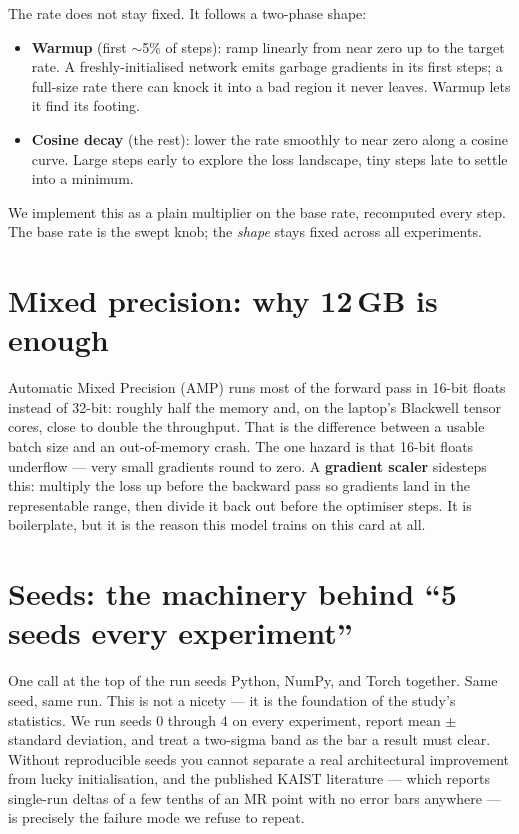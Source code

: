 \documentclass[../main.tex]{subfiles}
\begin{document}
The rate does not stay fixed. It follows a two-phase shape:

\begin{itemize}
  \item \textbf{Warmup} (first $\sim$5\% of steps): ramp linearly from near zero up to the target
        rate. A freshly-initialised network emits garbage gradients in its first steps; a full-size
        rate there can knock it into a bad region it never leaves. Warmup lets it find its footing.
  \item \textbf{Cosine decay} (the rest): lower the rate smoothly to near zero along a cosine curve.
        Large steps early to explore the loss landscape, tiny steps late to settle into a minimum.
\end{itemize}

We implement this as a plain multiplier on the base rate, recomputed every step. The base rate is
the swept knob; the \emph{shape} stays fixed across all experiments.

\section{Mixed precision: why 12\,GB is enough}

Automatic Mixed Precision (AMP) runs most of the forward pass in 16-bit floats instead of 32-bit:
roughly half the memory and, on the laptop's Blackwell tensor cores, close to double the
throughput. That is the difference between a usable batch size and an out-of-memory crash. The one
hazard is that 16-bit floats underflow --- very small gradients round to zero. A \textbf{gradient
scaler} sidesteps this: multiply the loss up before the backward pass so gradients land in the
representable range, then divide it back out before the optimiser steps. It is boilerplate, but it
is the reason this model trains on this card at all.

\section{Seeds: the machinery behind ``5 seeds every experiment''}

One call at the top of the run seeds Python, NumPy, and Torch together. Same seed, same run. This
is not a nicety --- it is the foundation of the study's statistics. We run seeds $0$ through $4$ on
every experiment, report mean $\pm$ standard deviation, and treat a two-sigma band as the bar a
result must clear. Without reproducible seeds you cannot separate a real architectural improvement
from lucky initialisation, and the published KAIST literature --- which reports single-run deltas
of a few tenths of an MR point with no error bars anywhere --- is precisely the failure mode we
refuse to repeat.
\end{document}
